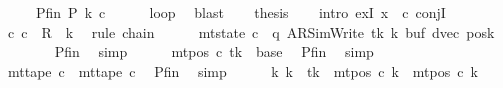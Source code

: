 \begin{isabellebody}
\ \ \ \ \ Pfin{\isacharcolon}{\kern0pt}\ {\isachardoublequoteopen}{\isacharquery}{\kern0pt}P\ {\isacharquery}{\kern0pt}k\ c{\isacharprime}{\kern0pt}{\isachardoublequoteclose}\isanewline
\ \ \ \ \isamarkupfalse%
\ loop\ \isamarkupfalse%
\ blast\isanewline
\ \ \isamarkupfalse%
\ {\isacharquery}{\kern0pt}thesis\isanewline
\ \ \isamarkupfalse%
\ {\isacharparenleft}{\kern0pt}intro\ exI{\isacharbrackleft}{\kern0pt}\ x\ {\isacharequal}{\kern0pt}\ c{\isacharprime}{\kern0pt}{\isacharbrackright}{\kern0pt}\ conjI{\isacharparenright}{\kern0pt}\isanewline
\ \ \ \ \isamarkupfalse%
\ {\isachardoublequoteopen}{\isacharparenleft}{\kern0pt}c{}{\isacharcomma}{\kern0pt}\ c{\isacharprime}{\kern0pt}{\isacharparenright}{\kern0pt}\ {\isasymin}\ R{\isacharprime}{\kern0pt}\ {\isacharcircum}{\kern0pt}{\isacharcircum}{\kern0pt}\ {\isacharquery}{\kern0pt}k{\isachardoublequoteclose}\ \isamarkupfalse%
\ {\isacharparenleft}{\kern0pt}rule\ chain{\isacharparenright}{\kern0pt}\isanewline
\ \ \ \ \isamarkupfalse%
\ {\isachardoublequoteopen}mt{\isacharunderscore}{\kern0pt}state\ c{\isacharprime}{\kern0pt}\ {\isacharequal}{\kern0pt}\ {\isacharparenleft}{\kern0pt}q{\isacharcomma}{\kern0pt}\ AR{\isacharunderscore}{\kern0pt}SimWrite{\isacharcomma}{\kern0pt}\ tk{\isacharcomma}{\kern0pt}\ {\isacharquery}{\kern0pt}k{\isacharcomma}{\kern0pt}\ buf{\isacharcomma}{\kern0pt}\ dvec{\isacharcomma}{\kern0pt}\ posk{\isacharparenright}{\kern0pt}{\isachardoublequoteclose}\isanewline
\ \ \ \ \ \ \isamarkupfalse%
\ Pfin\ \isamarkupfalse%
\ simp\isanewline
\ \ \ \ \isamarkupfalse%
\ {\isachardoublequoteopen}mt{\isacharunderscore}{\kern0pt}pos\ c{\isacharprime}{\kern0pt}\ tk\ {\isacharequal}{\kern0pt}\ base{\isachardoublequoteclose}\ \isamarkupfalse%
\ Pfin\ \isamarkupfalse%
\ simp\isanewline
\ \ \ \ \isamarkupfalse%
\ {\isachardoublequoteopen}mt{\isacharunderscore}{\kern0pt}tape\ c{\isacharprime}{\kern0pt}\ {\isacharequal}{\kern0pt}\ mt{\isacharunderscore}{\kern0pt}tape\ c{}{\isachardoublequoteclose}\ \isamarkupfalse%
\ Pfin\ \isamarkupfalse%
\ simp\isanewline
\ \ \ \ \isamarkupfalse%
\ {\isachardoublequoteopen}{\isasymforall}k{\isacharprime}{\kern0pt}{\isachardot}{\kern0pt}\ k{\isacharprime}{\kern0pt}\ {\isasymnoteq}\ tk\ {\isasymlongrightarrow}\ mt{\isacharunderscore}{\kern0pt}pos\ c{\isacharprime}{\kern0pt}\ k{\isacharprime}{\kern0pt}\ {\isacharequal}{\kern0pt}\ mt{\isacharunderscore}{\kern0pt}pos\ c{}\ k{\isacharprime}{\kern0pt}{\isachardoublequoteclose}\ \isamarkupfalse%

\end{isabellebody}
